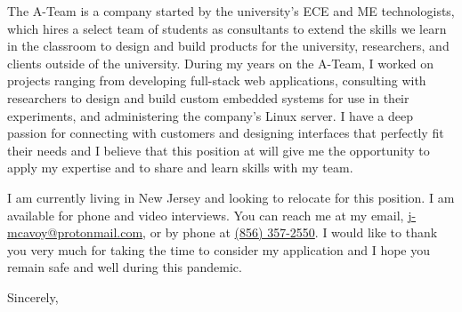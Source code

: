 \documentclass[11pt]{letter} %
\makeatletter
\newcommand{\myphonenumber}{\href{tel:+18563572550}{(856) 357-2550}}
\newcommand{\myemail}{\href{mailto:j-mcavoy@protonmail.com}{j-mcavoy@protonmail.com}}
\makeatother
\begin{document}
\begin{letter}
The A-Team is a company started by the university's ECE and ME technologists,
which hires a select team of students as consultants to extend the skills we
learn in the classroom to design and build products for the university,
researchers, and clients outside of the university. During my
years on the A-Team, I worked on projects ranging from developing full-stack web
applications, consulting with researchers to design and build custom embedded
systems for use in their experiments, and administering the company's Linux server.
I have a deep passion for connecting with customers and designing interfaces
that perfectly fit their needs and I believe that this position at {\company}
will give me the opportunity to apply my expertise and to share and learn
skills with my team.


I am currently living in New Jersey and looking to relocate for this position. I
am available for phone and video interviews. You can reach me at my email,
\myemail, or by phone at \myphonenumber. I would like to thank you very much for
taking the time to consider my application and I hope you remain safe and well
during this pandemic.

\closing{Sincerely,}



\end{letter}
\end{document}
